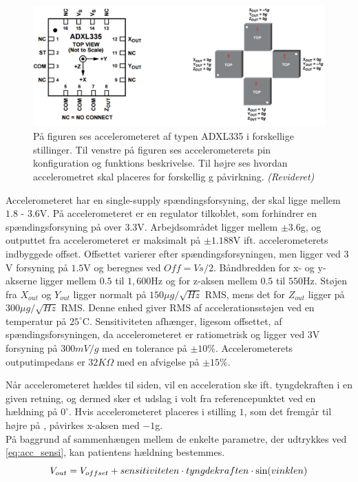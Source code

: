 \begin{figure}[H]
	\centering 
	\includegraphics[scale=0.5]{figures/cProblemloesning/ADXL335_2.JPG}
	\caption{På figuren ses accelerometeret af typen ADXL335 i forskellige stillinger. Til venstre på figuren ses accelerometerets pin konfiguration og funktions beskrivelse. Til højre ses hvordan accelerometret skal placeres for forskellig g påvirkning. \textit{(Revideret)} \cite{Devices2009}}
	\label{ADXL335}
\end{figure}

\noindent Accelerometeret har en single-supply spændingsforsyning, der skal ligge mellem $1.8$ - $3.6$V. På accelerometeret er en regulator tilkoblet, som forhindrer en spændingsforsyning på over $3.3$V.  Arbejdsområdet ligger mellem $\pm3.6$g, og outputtet fra accelerometeret er maksimalt på $\pm1.188$V ift. accelerometerets indbyggede offset. Offsettet varierer efter spændingsforsyningen, men ligger ved $3$V forsyning på $1.5$V og beregnes ved $Off = Vs/2$. Båndbredden for x- og y-akserne ligger mellem $0.5$ til $1,600$Hz og for z-aksen mellem $0.5$ til $550$Hz. Støjen fra $X_{out}$ og $Y_{out}$ ligger normalt på $150\mu g/\sqrt{Hz}$ RMS, mens det for $Z_{out}$ ligger på $300\mu g/\sqrt{Hz}$ RMS. Denne enhed giver RMS af accelerationsstøjen ved en temperatur på $25^\circ$C. Sensitiviteten afhænger, ligesom offsettet, af spændingsforsyningen, da accelerometeret er ratiometrisk og ligger ved $3$V forsyning på $300 mV/g$ med en tolerance på $\pm10\%$. Accelerometerets outputimpedans er $32K\Omega$ med en afvigelse på $\pm15\%$. \cite{Devices2009} %

Når accelerometeret hældes til siden, vil en acceleration ske ift. tyngdekraften i en given retning, og dermed sker et udslag i volt fra referencepunktet ved en hældning på $0^{\circ}$. Hvis accelerometeret placeres i stilling $1$, som det fremgår til højre på , påvirkes x-aksen med $-1$g.\cite{Devices2009} \\
På baggrund af sammenhængen mellem de enkelte parametre, der udtrykkes ved \eqref{eq:acc_sensi}, kan patientens hældning bestemmes.
\begin{equation}\label{eq:acc_sensi}
	V_{out} = V_{offset} + sensitiviteten \cdot tyngdekraften \cdot \sin(vinklen) \\
\end{equation}

